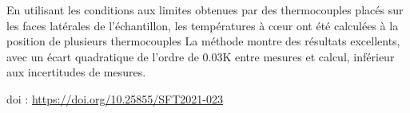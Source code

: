 {En utilisant les conditions aux limites obtenues par des thermocouples placés sur les faces latérales de l'échantillon, les températures à cœur ont été calculées à la position de plusieurs thermocouples La méthode montre des résultats excellents, avec un écart quadratique de l'ordre de 0.03K entre mesures et calcul, inférieur aux incertitudes de mesures.

 \vfill doi : \url{https://doi.org/10.25855/SFT2021-023}

}
 
